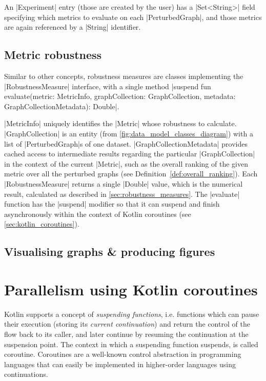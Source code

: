 An |Experiment| entry (those are created by the user) has a |Set<String>| field specifying which metrics to evaluate on each |PerturbedGraph|, and those metrics are again referenced by a |String| identifier.

\subsection{Metric robustness}

Similar to other concepts, robustness measures are classes implementing the |RobustnessMeasure| interface, with a single method |suspend fun evaluate(metric: MetricInfo, graphCollection: GraphCollection, metadata: GraphCollectionMetadata): Double|.

|MetricInfo| uniquely identifies the |Metric| whose robustness to calculate.
|GraphCollection| is an entity (from \autoref{fig:data_model_classes_diagram}) with a list of |PerturbedGraph|s of one dataset.
|GraphCollectionMetadata| provides cached\footnotemark{} access to intermediate results regarding the particular |GraphCollection| in the context of the current |Metric|, such as the overall ranking of the given metric over all the perturbed graphs (see Definition~\ref{def:overall_ranking}).
Each |RobustnessMeasure| returns a single |Double| value, which is the numerical result, calculated as described in \autoref{sec:robustness_measures}.
The |evaluate| function has the |suspend| modifier so that it can suspend and finish asynchronously within the context of Kotlin coroutines (see \autoref{sec:kotlin_coroutines}).

\subsection{Visualising graphs & producing figures}



\section{Parallelism using Kotlin coroutines}
\label{sec:kotlin_coroutines}

Kotlin supports a concept of \textsl{suspending functions}, i.e. functions which can pause their execution (storing its \textsl{current continuation}) and return the control of the flow back to its caller, and later continue by resuming the continuation at the suspension point.
The context in which a suspending function suspends, is called coroutine.
Coroutines are a well-known control abstraction in programming languages\cite{MouraRevisitingCoroutines2009} that can easily be implemented in higher-order languages using continuations\cite{HaynesContinuationsCoroutines1984}.

